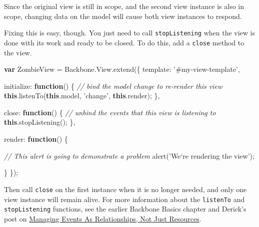 \documentclass[9pt]{book}
\newenvironment{Shaded}{}{}
\newcommand{\KeywordTok}[1]{\textcolor[rgb]{0.00,0.44,0.13}{\textbf{{#1}}}}
\newcommand{\DataTypeTok}[1]{\textcolor[rgb]{0.56,0.13,0.00}{{#1}}}
\newcommand{\StringTok}[1]{\textcolor[rgb]{0.25,0.44,0.63}{{#1}}}
\newcommand{\CommentTok}[1]{\textcolor[rgb]{0.38,0.63,0.69}{\textit{{#1}}}}
\newcommand{\OtherTok}[1]{\textcolor[rgb]{0.00,0.44,0.13}{{#1}}}
\newcommand{\FunctionTok}[1]{\textcolor[rgb]{0.02,0.16,0.49}{{#1}}}
\newcommand{\NormalTok}[1]{{#1}}
\begin{document}
Since the original view is still in scope, and the second view instance
is also in scope, changing data on the model will cause both view
instances to respond.

Fixing this is easy, though. You just need to call
\texttt{stopListening} when the view is done with its work and ready to
be closed. To do this, add a \texttt{close} method to the view.

\begin{Shaded}
\begin{Highlighting}[]
\KeywordTok{var} \NormalTok{ZombieView = }\OtherTok{Backbone}\NormalTok{.}\OtherTok{View}\NormalTok{.}\FunctionTok{extend}\NormalTok{(\{}
  \DataTypeTok{template}\NormalTok{: }\StringTok{'#my-view-template'}\NormalTok{,}

  \DataTypeTok{initialize}\NormalTok{: }\KeywordTok{function}\NormalTok{() \{}
    \CommentTok{// bind the model change to re-render this view}
    \KeywordTok{this}\NormalTok{.}\FunctionTok{listenTo}\NormalTok{(}\KeywordTok{this}\NormalTok{.}\FunctionTok{model}\NormalTok{, }\StringTok{'change'}\NormalTok{, }\KeywordTok{this}\NormalTok{.}\FunctionTok{render}\NormalTok{);}
  \NormalTok{\},}

  \DataTypeTok{close}\NormalTok{: }\KeywordTok{function}\NormalTok{() \{}
    \CommentTok{// unbind the events that this view is listening to}
    \KeywordTok{this}\NormalTok{.}\FunctionTok{stopListening}\NormalTok{();}
  \NormalTok{\},}

  \DataTypeTok{render}\NormalTok{: }\KeywordTok{function}\NormalTok{() \{}

    \CommentTok{// This alert is going to demonstrate a problem}
    \FunctionTok{alert}\NormalTok{(}\StringTok{'We`re rendering the view'}\NormalTok{);}

  \NormalTok{\}}
\NormalTok{\});}
\end{Highlighting}
\end{Shaded}

Then call \texttt{close} on the first instance when it is no longer
needed, and only one view instance will remain alive. For more
information about the \texttt{listenTo} and \texttt{stopListening}
functions, see the earlier Backbone Basics chapter and Derick's post on
\href{http://lostechies.com/derickbailey/2013/02/06/managing-events-as-relationships-not-just-references/}{Managing
Events As Relationships, Not Just Resources}.
\end{document}
